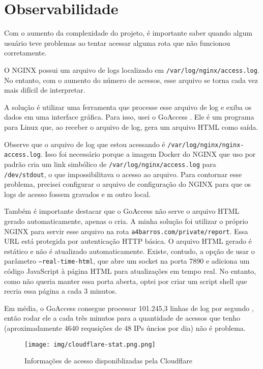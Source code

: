\chapter{Observabilidade}

Com o aumento da complexidade do projeto, é importante saber quando algum usuário teve problemas ao 
tentar acessar alguma rota que não funcionou corretamente.

O NGINX possui um arquivo de logs localizado em \verb|/var/log/nginx/access.log|. No entanto, com o 
aumento do número de acessos, esse arquivo se torna cada vez mais difícil de interpretar.

A solução é utilizar uma ferramenta que processe esse arquivo de log e exiba os dados em uma 
interface gráfica. Para isso, usei o GoAccess \cite{goaccess}. Ele é um programa para Linux que, 
ao receber o arquivo de log, gera um arquivo HTML como saída.



Observe que o arquivo de log que estou acessando é \verb|/var/log/nginx/nginx-access.log|. Isso foi 
necessário porque a imagem Docker do NGINX que uso por padrão cria um link simbólico de \verb|/var/log/nginx/access.log| 
para \verb|/dev/stdout|, o que impossibilitava o acesso ao arquivo. Para contornar esse problema, 
precisei configurar o arquivo de configuração do NGINX para que os logs de acesso fossem gravados e
m outro local.

Também é importante destacar que o GoAccess não serve o arquivo HTML gerado automaticamente, apenas 
o cria. A minha solução foi utilizar o próprio NGINX para servir esse arquivo na rota \texttt{a4barros.com/private/report}. 
Essa URL está protegida por autenticação HTTP básica. O arquivo HTML gerado é estático e não é 
atualizado automaticamente. Existe, contudo, a opção de usar o parâmetro \texttt{--real-time-html}, 
que abre um socket na porta 7890 e adiciona um código JavaScript à página HTML para atualizações em 
tempo real. No entanto, como não queria manter essa porta aberta, optei por criar um script shell 
que recria essa página a cada 3 minutos.



Em média, o GoAccess consegue processar 101.245,3 linhas de log por segundo \cite{goaccess-speed},
então rodar ele a cada três minutos para a quantidade de acessos que tenho (aproximadamente 4640 requsições
de 48 IPs úncios por dia) não é problema.

\begin{figure}[ht]
    \begin{center}
    \texttt{[image: img/cloudflare-stat.png.png]}
    \caption{Informações de acesso disponiblizadas pela Cloudflare}
    \label{fig:cloudflare-stat.png}
    \end{center}
\end{figure}